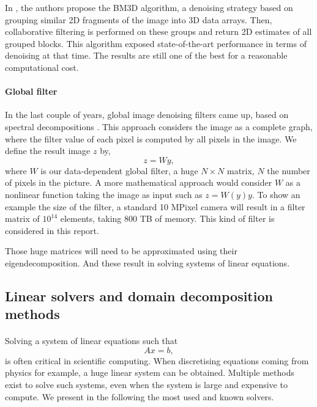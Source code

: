 In \cite{dabov_image_2007}, the authors propose the BM3D algorithm, a denoising strategy based on grouping similar 2D fragments of the image into 3D data arrays.
Then, collaborative filtering is performed on these groups and return 2D estimates of all grouped blocks.
This algorithm exposed state-of-the-art performance in terms of denoising at that time.
The results are still one of the best for a reasonable computational cost.

\paragraph{Global filter}
In the last couple of years, global image denoising filters came up, based on spectral decompositions \cite{glide_2014}.
This approach considers the image as a complete graph, where the filter value of each pixel is computed by all pixels in the image.
We define the result image \(z\) by,
\[z = Wy,\]
where \(W\) is our data-dependent global filter, a huge \(N \times N\) matrix, \(N\) the number of pixels in the picture.
A more mathematical approach would consider \(W\) as a nonlinear function taking the image as input such as \(z = W(y)y\).
To show an example the size of the filter, a standard 10 MPixel camera will result in a filter matrix of \(10^{14}\) elements, taking 800 TB of memory.
This kind of filter is considered in this report.

Those huge matrices will need to be approximated using their eigendecomposition.
And these result in solving systems of linear equations.

\subsection{Linear solvers and domain decomposition methods}

\paragraph{}
Solving a system of linear equations such that
\[Ax = b,\]
is often critical in scientific computing.
When discretising equations coming from physics for example, a huge linear system can be obtained.
Multiple methods exist to solve such systems, even when the system is large and expensive to compute.
We present in the following the most used and known solvers.

